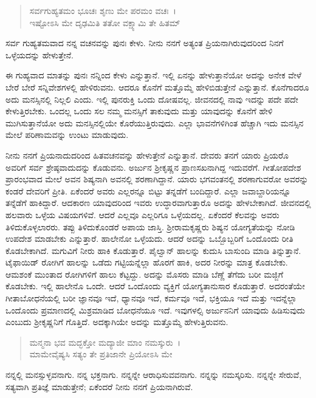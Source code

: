 \begin{verse}
ಸರ್ವಗುಹ್ಯತಮಂ ಭೂಚಃ ಶೃಣು ಮೇ ಪರಮಂ ವಚಃ~।\\ಇಷ್ಟೋಽಸಿ ಮೇ ದೃಢಮಿತಿ ತತೋ ವಕ್ಷ್ಯಾಮಿ ತೇ ಹಿತಮ್ 
\end{verse}

{\small ಸರ್ವ ಗುಹ್ಯತಮವಾದ ನನ್ನ ವಚನವನ್ನು ಪುನಃ ಕೇಳು. ನೀನು ನನಗೆ ಅತ್ಯಂತ ಪ್ರಿಯನಾಗಿರುವುದರಿಂದ ನಿನಗೆ ಒಳ್ಳೆಯದನ್ನು ಹೇಳುತ್ತೇನೆ.}

ಈ ಗುಹ್ಯವಾದ ಮಾತನ್ನು ಪುನಃ ನನ್ನಿಂದ ಕೇಳು ಎನ್ನುತ್ತಾನೆ. ಇಲ್ಲಿ ಏನನ್ನು ಹೇಳುತ್ತಾನೆಯೋ ಅದನ್ನು ಅನೇಕ ವೇಳೆ ಬೇರೆ ಬೇರೆ ಸನ್ನಿವೇಶಗಳಲ್ಲಿ ಹೇಳಿರುವನು. ಆದರೂ ಕೊನೆಗೆ ಮತ್ತೊಮ್ಮೆ ಹೇಳಿಬಿಡುತ್ತೇನೆ ಎನ್ನುತ್ತಾನೆ. ಕೊನೆಗಾದರೂ ಅದು ಮನಸ್ಸಿನಲ್ಲಿ ನಿಲ್ಲಲಿ ಎಂದು. ಇಲ್ಲಿ ಪುನರುಕ್ತಿ ಒಂದು ದೋಷವಲ್ಲ. ಜೀವನದಲ್ಲಿ ನಾವು ಇದನ್ನು ಪದೇ ಪದೇ ಕೇಳುತ್ತಿರಬೇಕು. ಒಂದಲ್ಲ ಒಂದು ಸಲ ನಮ್ಮ ಮನಸ್ಸಿಗೆ ತಾಕುವುದು ಮತ್ತು ಯಾವುದನ್ನು ಕೊನೆಗೆ ಹೇಳಿ ಮುಗಿಸುತ್ತಾನೆಯೋ ಅದು ಮನಸ್ಸಿನಲ್ಲಿಯೇ ಕೊರೆಯುತ್ತಿರುವುದು. ಎಲ್ಲಾ ಭಾವನೆಗಳಿಗಿಂತ ಹೆಚ್ಚಾಗಿ ಇದು ಮನಸ್ಸಿನ ಮೇಲೆ ಪರಿಣಾಮವನ್ನು ಉಂಟು ಮಾಡುವುದು.

ನೀನು ನನಗೆ ಪ್ರಿಯನಾದುದರಿಂದ ಹಿತವಚನವನ್ನು ಹೇಳುತ್ತೇನೆ ಎನ್ನುತ್ತಾನೆ. ದೇವರು ತನಗೆ ಯಾರು ಪ್ರಿಯರೊ ಅವರಿಗೆ ಸರ್ವ ಶ್ರೇಷ್ಠವಾದುದನ್ನು ಕೊಡುವನು. ಅರ್ಜುನ ಶ‍್ರೀಕೃಷ್ಣನ ಪ್ರಾಣಸಖನಾಗಿದ್ದ ಇದುವರೆಗೆ. ಗೀತೋಪದೇಶ ಪ್ರಾರಂಭವಾದ ಮೇಲೆ ಅವನ ಶಿಷ್ಯನಾಗಿ ಅವನಲ್ಲಿ ಶರಣಾಗಿದ್ದಾನೆ. ಯಾರು ಭಗವಂತನಲ್ಲಿ ಶರಣಾಗುವರೋ ಅವರನ್ನು ಕಂಡರೆ ದೇವರಿಗೆ ಪ್ರೀತಿ. ಏಕೆಂದರೆ ಅವರು ಎಲ್ಲರನ್ನೂ ಬಿಟ್ಟು ತನ್ನಡೆಗೆ ಬಂದಿದ್ದಾರೆ. ಎಲ್ಲಾ ಜವಾಬ್ದಾರಿಯನ್ನೂ ತನ್ನೆಡೆಗೆ ಹಾಕಿದ್ದಾರೆ. ಆದಕಾರಣ ಯಾವುದರಿಂದ ಇವರು ಉದ್ಧಾರವಾಗುತ್ತಾರೊ ಅದನ್ನು ಹೇಳಬೇಕಾಗಿದೆ. ಜೀವನದಲ್ಲಿ ಹಲವಾರು ಒಳ್ಳೆಯ ವಿಷಯಗಳಿವೆ. ಆದರೆ ಎಲ್ಲವೂ ಎಲ್ಲರಿಗೂ ಒಳ್ಳೆಯದಲ್ಲ. ಏಕೆಂದರೆ ಕೆಲವನ್ನು ಅವರು ತಿಳಿದುಕೊಳ್ಳಲಾರರು. ತಪ್ಪು ತಿಳಿದುಕೊಂಡರೆ ಅಪಾಯ ಜಾಸ್ತಿ. ಶ‍್ರೀರಾಮಕೃಷ್ಣರು ಶಿಷ್ಯನ ಯೋಗ್ಯತೆಯನ್ನು ನೋಡಿ ಉಪದೇಶ ಮಾಡಬೇಕು ಎನ್ನುತ್ತಾರೆ. ಹಾಲೇನೋ ಒಳ್ಳೆಯದು. ಆದರೆ ಅದನ್ನು ಒಬ್ಬೊಬ್ಬರಿಗೆ ಒಂದೊಂದು ರೀತಿ ಕೊಡಬೇಕಾಗಿದೆ. ಮಗುವಿಗೆ ನೀರು ಹಾಕಿ ಕೊಡುತ್ತಾರೆ. ಪೈಲ್ವಾನ್ ಹಾಲನ್ನು ಕುದುಸಿ ಬಾಸುಂದಿ ಮಾಡಿ ತಿನ್ನುತ್ತಾನೆ. ಟೈಫಾಯಿಡ್ ರೋಗಿಗೆ ಹಾಲನ್ನು ಒಡೆದು ಗಟ್ಟಿಯನ್ನೆಲ್ಲಾ ಹೊರಗೆ ಹಾಕಿ, ಅದರ ನೀರನ್ನು ಮಾತ್ರ ಕೊಡಬೇಕು. ಆಮಶಂಕೆ ಮುಂತಾದ ರೋಗಿಗಳಿಗೆ ಹಾಲು ಕೆಟ್ಟದ್ದು. ಅದನ್ನು ಮೊಸರು ಮಾಡಿ ಬೆಣ್ಣೆ ತೆಗೆದು ಬರೀ ಮಜ್ಜಿಗೆ ಕೊಡಬೇಕು. ಇಲ್ಲಿ ಹಾಲೇನೊ ಒಂದೇ. ಆದರೆ ಒಂದೊಂದು ವ್ಯಕ್ತಿಗೆ ಯೋಗ್ಯತಾನುಸಾರ ಕೊಡುತ್ತಾರೆ. ಅದರಂತೆಯೇ ಗೀತಾಬೋಧನೆಯಲ್ಲಿ ಬರೀ ಜ್ಞಾನವೂ ಇದೆ, ಧ್ಯಾನವೂ ಇದೆ, ಕರ್ಮವೂ ಇದೆ, ಭಕ್ತಿಯೂ ಇದೆ ಮತ್ತು ಇದನ್ನೆಲ್ಲಾ ಒಂದೊಂದು ಪ್ರಮಾಣದಲ್ಲಿ ಮಿಶ್ರಮಾಡಿದ ಬೋಧನೆಯೂ ಇದೆ. ಇವುಗಳಲ್ಸಿ ಅರ್ಜುನನಿಗೆ ಯಾವುದು ಹಿಡಿಸುವುದು ಎಂಬುದು ಶ‍್ರೀಕೃಷ್ಣನಿಗೆ ಗೊತ್ತಿದೆ. ಅದಕ್ಕಾಗಿಯೇ ಅದನ್ನು ಮತ್ತೊಮ್ಮೆ ಹೇಳುತ್ತಿರುವನು.

\begin{verse}
ಮನ್ಮನಾ ಭವ ಮದ್ಭಕ್ತೋ ಮದ್ಯಾಜೀ ಮಾಂ ನಮಸ್ಕುರು~।\\ಮಾಮೇವೈಷ್ಯಸಿ ಸತ್ಯಂ ತೇ ಪ್ರತಿಜಾನೇ ಪ್ರಿಯೋಽಸಿ ಮೇ 
\end{verse}

{\small ನನ್ನಲ್ಲಿ ಮನಸ್ಸುಳ್ಳವನಾಗು. ನನ್ನ ಭಕ್ತನಾಗು. ನನ್ನನ್ನೇ ಆರಾಧಿಸುವವನಾಗು. ನನ್ನನ್ನು ನಮಸ್ಕರಿಸು. ನನ್ನನ್ನೇ ಸೇರುವೆ, ಸತ್ಯವಾಗಿ ಪ್ರತಿಜ್ಞೆ ಮಾಡುತ್ತೇನೆ; ಏಕೆಂದರೆ ನೀನು ನನಗೆ ಪ್ರಿಯನಾಗಿರುವೆ.}

